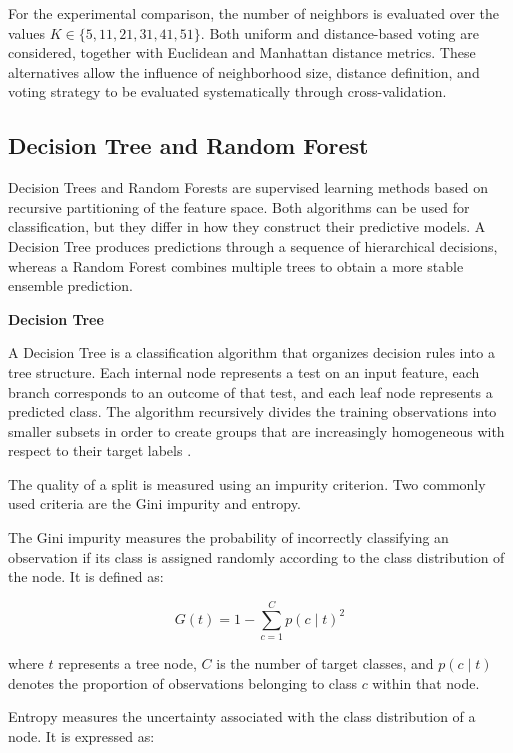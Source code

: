 For the experimental comparison, the number of neighbors is evaluated over the values $K \in \{5,11,21,31,41,51\}$. Both uniform and distance-based voting are considered, together with Euclidean and Manhattan distance metrics. These alternatives allow the influence of neighborhood size, distance definition, and voting strategy to be evaluated systematically through cross-validation.

\subsection{Decision Tree and Random Forest}

Decision Trees and Random Forests are supervised learning methods based on recursive partitioning of the feature space. Both algorithms can be used for classification, but they differ in how they construct their predictive models. A Decision Tree produces predictions through a sequence of hierarchical decisions, whereas a Random Forest combines multiple trees to obtain a more stable ensemble prediction.

\textbf{Decision Tree}

A Decision Tree is a classification algorithm that organizes decision rules into a tree structure. Each internal node represents a test on an input feature, each branch corresponds to an outcome of that test, and each leaf node represents a predicted class. The algorithm recursively divides the training observations into smaller subsets in order to create groups that are increasingly homogeneous with respect to their target labels \cite{breiman1984classification}.

The quality of a split is measured using an impurity criterion. Two commonly used criteria are the Gini impurity and entropy.

The Gini impurity measures the probability of incorrectly classifying an observation if its class is assigned randomly according to the class distribution of the node. It is defined as:

\begin{equation}
    G(t)
    =
    1-\sum_{c=1}^{C}p(c\mid t)^2
    \label{eq:gini-impurity}
\end{equation}

where $t$ represents a tree node, $C$ is the number of target classes, and $p(c\mid t)$ denotes the proportion of observations belonging to class $c$ within that node.

Entropy measures the uncertainty associated with the class distribution of a node. It is expressed as:

